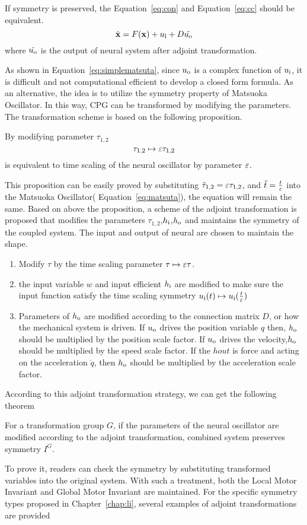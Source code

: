 If symmetry is preserved, the Equation~\ref{eq:con} and Equation~\ref{eq:cc} should be equivalent.
\begin{equation}
\label{eq:con}
\dot{\mathbf{x}}=F(\mathbf{x})+u_{\mathrm{l}}+D\tilde{u_{\mathrm{o}}}
\end{equation}
where $\tilde{u_{\mathrm{o}}}$ is the output of neural system after adjoint transformation.

As shown in Equation~\ref{eq:simplematsuta}, since $u_{\mathrm{o}}$ is a complex function of $u_{\mathrm{i}}$,
it is difficult   and not computational efficient to develop a closed form formula.
As an alternative, the idea is to utilize the symmetry property  of Matsuoka Oscillator.
In this way, CPG can be transformed by modifying the parameters.
The transformation scheme is based on the following proposition.


\begin{myprop}
By modifying parameter $\tau_{1,2}$
\[
\tau_{1,2} \mapsto \varepsilon \tau_{1,2}
\]
is equivalent to time scaling of the neural oscillator by parameter $\varepsilon$.
\end{myprop}

This proposition can be easily proved by  substituting $\tilde{\tau}_{1,2}=\varepsilon \tau_{1,2}$, and $\tilde{t}=\frac{t}{\varepsilon}$ into the Matsuoka Oscillator( Equation~\ref{eq:matsuta}), the equation will remain the same.
Based on above the proposition, a scheme of the adjoint transformation is proposed that modifies the parameters $\tau_{1,2}$,$h_{\mathrm{i}}$,$h_{\mathrm{o}}$ and maintains the symmetry of the  coupled system.
The input and output of neural are chosen to maintain the shape.
\begin{enumerate}
\item Modify $\tau$ by the time scaling parameter $\tau \mapsto \varepsilon \tau$.
\item the input variable $w$ and input efficient $h_{\mathrm{i}}$ are modified to make sure the input function satisfy the time scaling symmetry $u_{\mathrm{i}}(t) \mapsto u_{\mathrm{i}}(\frac{t}{\varepsilon})$
\item  Parameters of $h_{\mathrm{o}}$ are modified according to the connection matrix $D$, or how the mechanical system is driven.
If $u_{\mathrm{o}}$ drives the position variable $q$ then, $h_{\mathrm{o}}$ should be multiplied by the position scale factor. 
If $u_{\mathrm{o}}$ drives the velocity,$h_{\mathrm{o}}$ should be  multiplied by the speed scale factor.
If the $hout$ is force and acting on the acceleration $\ddot{q}$, then $h_{\mathrm{o}}$ should be multiplied by the acceleration scale factor.
\end{enumerate}


According to this adjoint transformation strategy, we can get the following theorem
\begin{mythe}
For a transformation group $G$, if the parameters of the neural oscillator are modified according to the adjoint transformation,
combined system preserves symmetry $I^G$.
\end{mythe}
To prove it, readers can check the symmetry by substituting transformed variables into the original system.
With such a treatment, both the Local Motor Invariant and Global Motor Invariant are maintained.
For the specific symmetry types proposed in Chapter~\ref{chap:li}, several examples of adjoint transformations are provided


